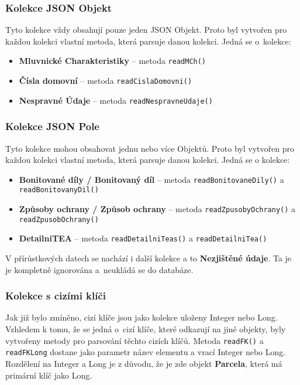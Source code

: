 \subsubsection*{Kolekce JSON Objekt}
Tyto kolekce vždy obsahují pouze jeden JSON Objekt.
Proto byl vytvořen pro každou kolekci vlastní metoda, která parsuje danou kolekci.
Jedná se o~kolekce:
\begin{itemize}
    \item \textbf{Mluvnické Charakteristiky} -- metoda \texttt{readMCh()}
    \item \textbf{Čísla domovní} -- metoda \texttt{readCislaDomovni()}
    \item \textbf{Nespravné Údaje} -- metoda \texttt{readNespravneUdaje()}
\end{itemize}

\subsubsection*{Kolekce JSON Pole}
Tyto kolekce mohou obsahovat jednu nebo více Objektů.
Proto byl vytvořen pro každou kolekci vlastní metoda, která parsuje danou kolekci.
Jedná se o kolekce:
\begin{itemize}
    \item \textbf{Bonitované díly / Bonitovaný díl} -- metoda \texttt{readBonitovaneDily()} a \texttt{readBonitovanyDil()}
    \item \textbf{Způsoby ochrany / Způsob ochrany} -- metoda \texttt{readZpusobyOchrany()} a \texttt{readZpusobOchrany()}
    \item \textbf{DetailniTEA} -- metoda \texttt{readDetailniTeas()} a \texttt{readDetailniTea()}
\end{itemize}

V přírůstkových datech se nachází i další kolekce a to \textbf{Nezjištěné údaje}.
Ta je je kompletně ignorována a~neukládá se do databáze.

\subsubsection*{Kolekce s cizími klíči}
Jak již bylo zmíněno, cizí klíče jsou jako kolekce uloženy Integer nebo Long.
Vzhledem k tomu, že se jedná o~cizí klíče, které odkazují na jiné objekty,
byly vytvořeny metody pro parsování těchto cizích klíčů.
Metoda \texttt{readFK()} a \texttt{readFKLong} dostane jako parametr název elementu a vrací Integer nebo Long.
Rozdělení na Integer a Long je z důvodu, že je zde objekt \textbf{Parcela}, která má primární klíč jako Long.

